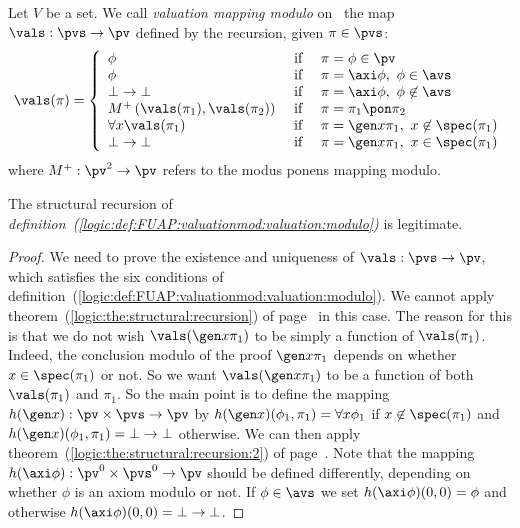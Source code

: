 \begin{defin}\label{logic:def:FUAP:valuationmod:valuation:modulo}
Let $V$ be a set. We call {\em valuation mapping modulo} on \pvs\
the map $\vals:\pvs\to\pv$ defined by the recursion, given
$\pi\in\pvs$:
\[
                    \vals(\pi)=\left\{
                    \begin{array}{lcl}
                    \phi&\mbox{\ if\ }&\pi=\phi\in\pv\\
                    \phi&\mbox{\ if\ }&\pi=\axi\phi,\ \phi\in\avs\\
                    \bot\to\bot&\mbox{\ if\ }&\pi=\axi\phi,\ \phi\not\in\avs\\
                    M^{+}\,(\vals(\pi_{1}), \vals(\pi_{2})) &
                    \mbox{\ if\ }&\pi=\pi_{1}\pon\pi_{2}\\
                    \forall x\vals(\pi_{1})&\mbox{\ if\ }&\pi=\gen
                    x\pi_{1},\  x\not\in\spec(\pi_{1})\\
                    \bot\to\bot&\mbox{\ if\ }&\pi=\gen
                    x\pi_{1},\  x\in\spec(\pi_{1})\\
                    \end{array}\right.
\]
where $M^{+}:\pv^{2}\to\pv$ refers to the modus ponens mapping
modulo.
\end{defin}
\begin{prop}
The structural recursion of {\em
definition~(\ref{logic:def:FUAP:valuationmod:valuation:modulo})} is
legitimate.
\end{prop}
\begin{proof}
We need to prove the existence and uniqueness of $\vals:\pvs\to\pv$,
which satisfies the six conditions of
definition~(\ref{logic:def:FUAP:valuationmod:valuation:modulo}). We
cannot apply theorem~(\ref{logic:the:structural:recursion}) of
page~\pageref{logic:the:structural:recursion} in this case. The
reason for this is that we do not wish $\vals(\gen x\pi_{1})$ to be
simply a function of $\vals(\pi_{1})$. Indeed, the conclusion modulo
of the proof $\gen x\pi_{1}$ depends on whether $x\in\spec(\pi_{1})$
or not. So we want $\vals(\gen x\pi_{1})$ to be a function of both
$\vals(\pi_{1})$ and $\pi_{1}$. So the main point is to define the
mapping $h(\gen x):\pv\times\pvs\to\pv$ by $h(\gen
x)(\phi_{1},\pi_{1}) =\forall x\phi_{1}$ if $x\not\in\spec(\pi_{1})$
and $h(\gen x)(\phi_{1},\pi_{1})=\bot\to\bot$ otherwise. We can then
apply theorem~(\ref{logic:the:structural:recursion:2}) of
page~\pageref{logic:the:structural:recursion:2}. Note that the
mapping $h(\axi\phi):\pv^{0}\times\pvs^{0}\to\pv$ should be defined
differently, depending on whether $\phi$ is an axiom modulo or not.
If $\phi\in\avs$ we set $h(\axi\phi)(0,0)=\phi$ and otherwise
$h(\axi\phi)(0,0)=\bot\to\bot$.
\end{proof}

